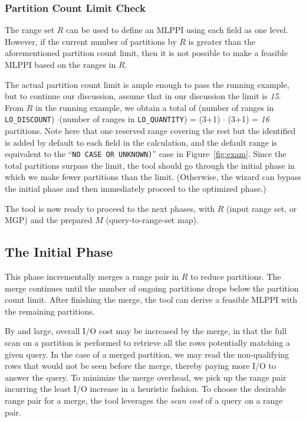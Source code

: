 \documentclass[runningheads]{comsis2}
\begin{document}
\subsubsection{Partition Count Limit Check}

The range set $R$ can be used to define an MLPPI using each field as one level. 
However, if the current number of partitions by $R$ is greater than 
the aforementioned partition count limit, 
then it is not possible to make a feasible MLPPI based on the ranges in $R$. 

The actual partition count limit is ample enough to pass the running example, 
but to continue our discussion, assume that in our discussion the limit is {\it 15}.
From $R$ in the running example, we obtain a total of (number of ranges in {\tt LO\_DISCOUNT}) 
$\cdot$(number of ranges in {\tt LO\_QUANTITY}) = (3+1) $\cdot$ (3+1) = {\it 16}
partitions. Note here that one reserved range covering the rest but the identified 
is added by default to each field in the calculation, 
and the default range is equivalent to the ``{\tt NO CASE OR UNKNOWN)}'' case in Figure~\ref{fig:exam}. 
Since the total partitions surpass the limit, 
the tool should go through the initial phase in which 
we make fewer partitions than the limit. 
(Otherwise, the wizard can bypass the initial phase and then immediately proceed to the optimized phase.) 

The tool is now ready to proceed to the next phases, 
with $R$ (input range set, or MGP) and the prepared $M$ (query-to-range-set map). 

\subsection{The Initial Phase}
\label{sec:init_phase}

This phase incrementally merges a range pair in $R$ to reduce partitions. 
The merge continues until the number of ongoing partitions 
drops below the partition count limit. 
After finishing the merge, the tool can derive a feasible MLPPI with the remaining partitions. 

By and large, overall I/O cost may be increased by the merge, 
in that the full scan on a partition is performed to retrieve all the rows potentially matching a given query. 
In the case of a merged partition, we may read the non-qualifying rows 
that would not be seen before the merge, thereby paying more I/O to answer 
the query. To minimize the merge overhead, we pick up the range pair incurring 
the least I/O increase in a heuristic fashion. 
To choose the desirable range pair for a merge, 
the tool leverages the {\em scan cost} of a query on a range pair.
\end{document}
